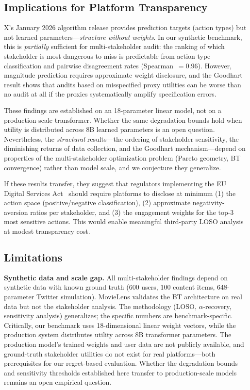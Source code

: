 \documentclass[11pt,letterpaper]{article}
\begin{document}
\subsection{Implications for Platform Transparency}

X's January 2026 algorithm release provides prediction targets (action
types) but not learned parameters---\emph{structure without weights}.
In our synthetic benchmark, this is \emph{partially} sufficient for
multi-stakeholder audit: the ranking of which stakeholder is most
dangerous to miss is predictable from action-type classification and
pairwise disagreement rates (Spearman~$= 0.96$). However, magnitude
prediction requires approximate weight disclosure, and the Goodhart
result shows that audits based on misspecified proxy utilities can be
worse than no audit at all if the proxies systematically amplify
specification errors.

These findings are established on an 18-parameter linear model, not
on a production-scale transformer. Whether the same degradation
bounds hold when utility is distributed across 8B learned parameters
is an open question. Nevertheless, the \emph{structural} results---the
ordering of stakeholder sensitivity, the diminishing returns of data
collection, and the Goodhart mechanism---depend on properties of the
multi-stakeholder optimization problem (Pareto geometry, BT
convergence) rather than model scale, and we conjecture they
generalize.

If these results transfer, they suggest that regulators implementing
the EU Digital Services Act~\cite{lasser2025designing} should require
platforms to disclose at minimum (1) the action space
(positive/negative classification), (2) approximate negativity-aversion
ratios per stakeholder, and (3) the engagement weights for the top-3
most sensitive actions. This would enable meaningful third-party LOSO
analysis at modest transparency cost.

\subsection{Limitations}

\textbf{Synthetic data and scale gap.} All multi-stakeholder findings
depend on synthetic data with known ground truth (600 users, 100
content items, 648-parameter Twitter simulation). MovieLens validates
the BT architecture on real data but not the stakeholder analysis.
The methodology (LOSO, $\alpha$-recovery, sensitivity analysis)
generalizes; the specific numbers are benchmark-specific. Critically,
our benchmark uses 18-dimensional linear weight vectors, while the
production system distributes utility across 8B transformer parameters.
The production model's trained weights and user data are not publicly
available, and ground-truth stakeholder utilities do not exist for
real platforms---both prerequisites for our regret-based evaluation.
Whether the degradation bounds and sensitivity thresholds established
here transfer to production-scale models remains an open empirical
question.
\end{document}
